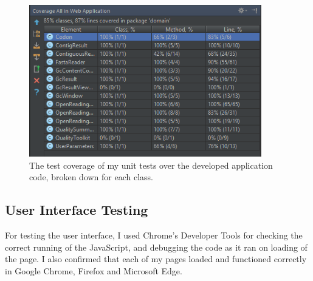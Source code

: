 \begin{figure}[H]
\centering
\includegraphics[width=0.9\textwidth]{images/testcoverage2}
\caption{The test coverage of my unit tests over the developed application code, broken down for each class.}
\end{figure}

\subsection{User Interface Testing}
For testing the user interface, I used Chrome's Developer Tools for checking the correct running of the JavaScript, and debugging the code as it ran on loading of the page. I also confirmed that each of my pages loaded and functioned correctly in Google Chrome, Firefox and Microsoft Edge.

